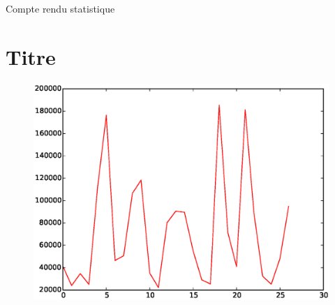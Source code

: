 \documentclass[a4paper,12pt]{report}
\begin{document}
\begin{center}
\LARGE{Compte rendu statistique} \
\end{center}
\part{ Titre}
 \begin{figure}[H]
\centering 
\includegraphics[scale=0.5]{../Images/Graphes/Courbe0.eps}
\end{figure}
\end{document}
